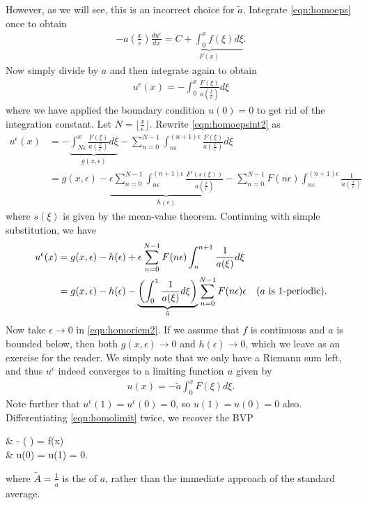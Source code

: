 However, as we will see, this is an incorrect choice for $\tilde{a}$. Integrate \eqref{eqn:homoeps} once to obtain
\begin{align} \label{eqn:homoepsint1}
-a\left(\frac{x}{\epsilon}\right) \frac{du^{\epsilon}}{dx} = \underbrace{C + \int_{0}^{x} f(\xi) d\xi}_{F(x)}.
\end{align}
Now simply divide by $a$ and then integrate again to obtain
\begin{align} \label{eqn:homoepsint2}
    u^{\epsilon}(x) = -\int_{0}^{x} \frac{F(\xi)}{a\left(\frac{\xi}{\epsilon}\right)} d\xi
\end{align}
where we have applied the boundary condition $u(0) = 0$ to get rid of the integration constant. Let $N = \lfloor \frac{x}{\epsilon} \rfloor$. Rewrite \eqref{eqn:homoepsint2} as 
\begin{align} \label{eqn:homoriem}
    u^{\epsilon}(x) &= -\underbrace{\int_{N\epsilon}^{x} \frac{F(\xi)}{a\left(\frac{x}{\epsilon}\right)} d\xi}_{g(x,\epsilon)} - \sum_{n=0}^{N-1} \int_{n\epsilon}^{(n+1)\epsilon} \frac{F(\xi)}{a\left(\frac{x}{\epsilon}\right)} d\xi & \nonumber \\
    &= g(x,\epsilon) - \underbrace{\epsilon \sum_{n=0}^{N-1}\int_{n\epsilon}^{(n+1)\epsilon} \frac{F'(s(\xi))}{a\left(\frac{\xi}{\epsilon}\right)}}_{h(\epsilon)} - \sum_{n=0}^{N-1} F(n\epsilon) \int_{n\epsilon}^{(n+1)\epsilon} \frac{1}{a\left(\frac{x}{\epsilon}\right)} 
\end{align}
where $s(\xi)$ is given by the mean-value theorem. Continuing with simple substitution, we have
\begin{align} \label{eqn:homoriem2}
u^{\epsilon}(x) &= g(x,\epsilon) - h(\epsilon) + \epsilon \sum_{n=0}^{N-1} F(n\epsilon) \int_{n}^{n+1} \frac{1}{a(\xi)} d\xi \nonumber &\\
&= g(x,\epsilon) - h(\epsilon) - \underbrace{\left( \int_{0}^{1} \frac{1}{a(\xi)}d\xi\right)}_{\tilde{a}} \sum_{n=0}^{N-1} F(n\epsilon) \epsilon & (a \textup{ is } 1\textup{-periodic}).
\end{align}
Now take $\epsilon \to 0$ in \eqref{eqn:homoriem2}. If we assume that $f$ is continuous and $a$ is bounded below, then both $g(x,\epsilon) \to 0$ and $h(\epsilon) \to 0$, which we leave as an exercise for the reader. We  simply note that we only have a Riemann sum left, and thus $u^{\epsilon}$ indeed converges to a limiting function $u$ given by
\begin{align} \label{eqn:homolimit}
    u(x) = -\tilde{a} \int_{0}^{x} F(\xi) d\xi.
\end{align}
Note further that $u^{\epsilon}(1) = u^{\epsilon}(0) = 0$, so $u(1) = u(0) = 0$ also.
Differentiating \eqref{eqn:homolimit} twice, we recover the BVP
\begin{ceqn} \label{eqn:odelimit}
& - \left(   \right) = f(x) \\
& u(0) = u(1) = 0.
\end{ceqn}
where $\tilde{A} = \frac{1}{\tilde{a}}$ is the  of $a$, rather than the immediate approach of the standard average.